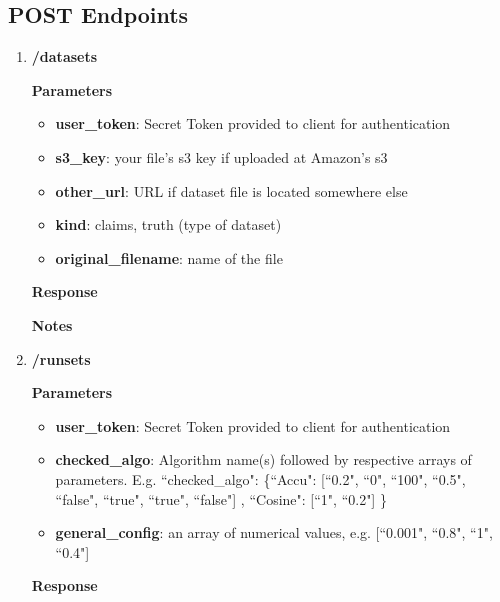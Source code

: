 \documentclass[a4paper,10pt]{scrartcl}
\begin{document}
\subsection{POST Endpoints}
\begin{enumerate}
 \item \textbf{/datasets}
\textbf{Parameters}
\begin{itemize}
\item \textbf{user\_token}: Secret Token provided to client for authentication 
\item \textbf{s3\_key}: your file's s3 key if uploaded at Amazon's s3
\item \textbf{other\_url}: URL if dataset file is located somewhere else
\item \textbf{kind}: claims, truth (type of dataset)
\item \textbf{original\_filename}: name of the file 
\end{itemize}
\textbf{Response}
\textbf{Notes}
%
 \item \textbf{/runsets}
\textbf{Parameters}
\begin{itemize}
 \item \textbf{user\_token}: Secret Token provided to client for authentication 
 \item  \textbf{checked\_algo}: Algorithm name(s) followed by respective arrays of parameters. E.g. ``checked\_algo": \{``Accu": [``0.2", ``0", ``100", ``0.5", ``false", ``true", ``true", ``false"] , ``Cosine": [``1", ``0.2"] \}
 \item \textbf{general\_config}: an array of numerical values, e.g. [``0.001", ``0.8", ``1", ``0.4"]
\end{itemize}
\textbf{Response}
\end{enumerate}
\end{document}
